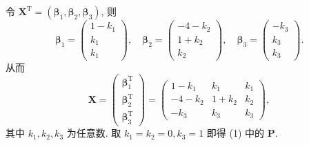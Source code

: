 \documentclass[../../main.tex]{subfiles}
\begin{document}
\begin{solution}
令 $\boldsymbol{X}^\mathrm{T} = \left( \boldsymbol{\beta}_1, \boldsymbol{\beta}_2, \boldsymbol{\beta}_3 \right)$, 则
\[
\boldsymbol{\beta}_1 = \begin{pmatrix} 1 - k_1 \\ k_1 \\ k_1 \end{pmatrix}, \quad \boldsymbol{\beta}_2 = \begin{pmatrix} -4 - k_2 \\ 1 + k_2 \\ k_2 \end{pmatrix}, \quad \boldsymbol{\beta}_3 = \begin{pmatrix} -k_3 \\ k_3 \\ k_3 \end{pmatrix}.
\]
从而
\[
\boldsymbol{X} = \begin{pmatrix} 
\boldsymbol{\beta}_1^\mathrm{T} \\
\boldsymbol{\beta}_2^\mathrm{T} \\
\boldsymbol{\beta}_3^\mathrm{T} 
\end{pmatrix} = \begin{pmatrix} 
1 - k_1 & k_1 & k_1 \\
-4 - k_2 & 1 + k_2 & k_2 \\
-k_3 & k_3 & k_3 
\end{pmatrix},
\]
其中 $k_1, k_2, k_3$ 为任意数.
取 $k_1 = k_2 = 0, k_3 = 1$ 即得 (1) 中的 $\boldsymbol{P}$.

\end{solution}
\end{document}
